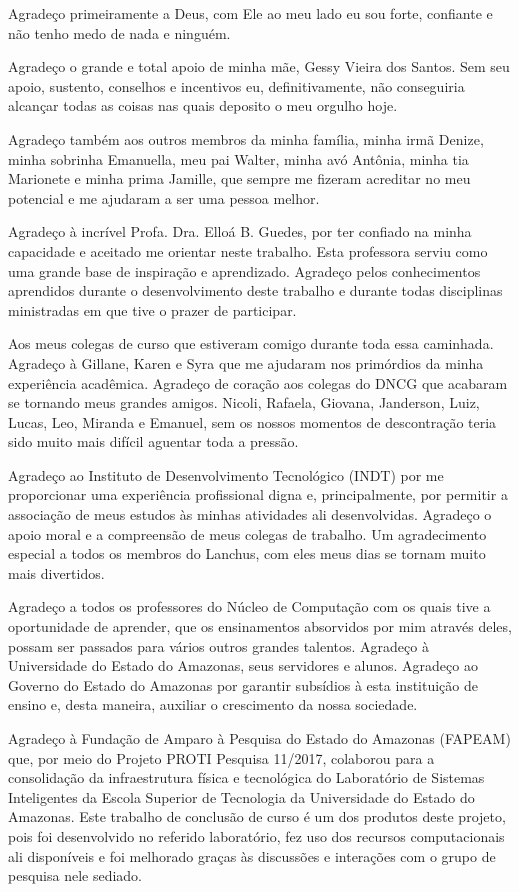 Agradeço primeiramente a Deus, com Ele ao meu lado eu sou forte, confiante e não tenho medo de nada e ninguém.

Agradeço o grande e total apoio de minha mãe, Gessy Vieira dos Santos. Sem seu apoio, sustento, conselhos e incentivos eu, definitivamente, não conseguiria alcançar todas as coisas nas quais deposito o meu orgulho hoje. 

Agradeço também aos outros membros da minha família, minha irmã Denize, minha sobrinha Emanuella, meu pai Walter, minha avó Antônia, minha tia Marionete e minha prima Jamille, que sempre me fizeram acreditar no meu potencial e me ajudaram a ser uma pessoa melhor.

Agradeço à incrível Profa. Dra. Elloá B. Guedes, por ter confiado na minha capacidade e aceitado me orientar neste trabalho. Esta professora serviu como uma grande base de inspiração e aprendizado. Agradeço pelos conhecimentos aprendidos durante o desenvolvimento deste trabalho e  durante todas disciplinas ministradas em que tive o prazer de participar.

Aos meus colegas de curso que estiveram comigo durante toda essa caminhada. Agradeço à Gillane, Karen e Syra que me ajudaram nos primórdios da minha experiência acadêmica. Agradeço de coração aos colegas do DNCG que acabaram se tornando meus grandes amigos. Nicoli, Rafaela, Giovana, Janderson, Luiz, Lucas, Leo, Miranda e Emanuel, sem os nossos momentos de descontração teria sido muito mais difícil aguentar toda a pressão.

Agradeço ao Instituto de Desenvolvimento Tecnológico (INDT) por me proporcionar uma experiência profissional digna e, principalmente, por permitir a associação de meus estudos às minhas atividades ali desenvolvidas. Agradeço o apoio moral e a compreensão de meus colegas de trabalho. Um agradecimento especial a todos os membros do Lanchus, com eles meus dias se tornam muito mais divertidos.

Agradeço a todos os professores do Núcleo de Computação com os quais tive a oportunidade de aprender, que os ensinamentos absorvidos por mim através deles, possam ser passados para vários outros grandes talentos. Agradeço à Universidade do Estado do Amazonas, seus servidores e alunos. Agradeço ao Governo do Estado do Amazonas por garantir subsídios à esta instituição de ensino e, desta maneira, auxiliar o crescimento da nossa sociedade.

Agradeço à Fundação de Amparo à Pesquisa do Estado do Amazonas (FAPEAM) que, por meio do Projeto PROTI Pesquisa 11/2017, colaborou para a consolidação da infraestrutura física e tecnológica do Laboratório de Sistemas Inteligentes da Escola Superior de Tecnologia da Universidade do Estado do Amazonas. Este trabalho de conclusão de curso é um dos produtos deste projeto, pois foi desenvolvido no referido laboratório, fez uso dos recursos computacionais ali disponíveis e foi melhorado graças às discussões e interações com o grupo de pesquisa nele sediado.